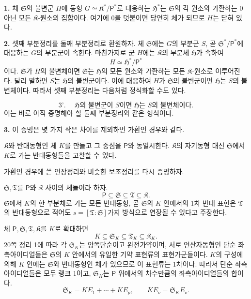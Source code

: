 \textbf{1.} 체 \(\mathfrak S\)의 불변군 \(H\)에 동형 \(G\simeq\mathfrak K^*/\mathsf P^*\)로 대응하는 \(\mathfrak H^*\)는 \(\mathfrak S\)의 각 원소와 가환하는 0 아닌 모든 \(\mathfrak K\)-원소의 집합이다. 여기에 0을 덧붙이면 당연히 체가 되므로 \(H\)는 닫혀 있다.

\textbf{2.} 셋째 부분정리를 둘째 부분정리로 환원하자. 체 \(\mathfrak S\)에는 \(G\)의 부분군 \(S\), 곧 \(\mathfrak S^*/\mathsf P^*\)에 대응하는 \(G\)의 부분군이 속한다. 마찬가지로 군 \(H\)에는 \(\mathfrak K\)의 부분체 \(\mathfrak H\)가 속하여
\[
        H\simeq\mathfrak H^*/\mathsf P^*
\]
이다. \(\mathfrak S\)가 \(H\)의 불변체이면 \(\mathfrak S\)는 \(\mathfrak H\)의 모든 원소와 가환하는 모든 \(\mathfrak K\)-원소로 이루어진다. 달리 말하면 \(S\)는 \(\mathfrak H\)의 불변군이다. 이에 대응하여 \(H\)가 \(\mathfrak S\)의 불변군이면 \(\mathfrak H\)는 \(S\)의 불변체이다. 따라서 셋째 부분정리는 다음처럼 정식화할 수도 있다.

\[
\text{3'. }\quad
\mathfrak H\text{의 불변군이 }S\text{이면 }
\mathfrak H\text{는 }S\text{의 불변체이다.}
\]
이는 바로 아직 증명해야 할 둘째 부분정리와 같은 형식이다.

\textbf{3.} 이 증명은 몇 가지 작은 차이를 제외하면 가환인 경우와 같다.

\(\mathfrak K\)와 반대동형인 체 \(K\)를 만들고 그 중심을 \(\mathsf P\)와 동일시한다. \(\mathfrak K\)의 자기동형 대신 \(\mathfrak S\)에서 \(K\)로 가는 반대동형들을 고찰할 수 있다.

가환인 경우에 쓴 연장정리와 비슷한 보조정리를 다시 증명하자.

\(\mathfrak S,\mathfrak T\)를 \(\mathsf P\)와 \(\mathfrak K\) 사이의 체들이라 하자.
\[
        \mathsf P\subseteq\mathfrak S
        \subseteq\mathfrak T\subseteq\mathfrak K.
\]
\(\mathfrak S\)에서 \(K\)의 한 부분체로 가는 모든 반대동형, 곧 \(\mathfrak S\)의 \(K\) 안에서의 1차 반대 표현은 \(\mathfrak T\)의 반대동형으로 적어도 \(s=[\mathfrak T:\mathfrak S]\)가지 방식으로 연장될 수 있다고 주장한다.

체 \(\mathsf P,\mathfrak S,\mathfrak T,\mathfrak K\)를 \(K\)로 확대하면
\[
        K\subseteq\mathfrak S_K
        \subseteq\mathfrak T_K
        \subseteq\mathfrak K_K.
\]
20쪽 정리 1에 따라 각 \(\mathfrak S_K\)는 양쪽단순이고 완전가약이며, 서로 연산자동형인 단순 좌측아이디얼들은 \(\mathfrak S\)의 \(K\) 안에서의 유일한 기약 표현류의 표현가군들이다. \(K\)의 구성에 의해 \(K\) 안에는 \(\mathfrak S\)와 반대동형인 체가 있으므로 이 표현류는 1차이다. 따라서 단순 좌측아이디얼들은 모두 랭크 1이고, \(\mathfrak S_K\)는 \(\mathsf P\) 위에서의 차수만큼의 좌측아이디얼들의 합이다.
\[
        \mathfrak S_K
        =K E_1+\cdots+K E_p,
        \qquad
        K E_\nu=\mathfrak S_K E_\nu.
\]

